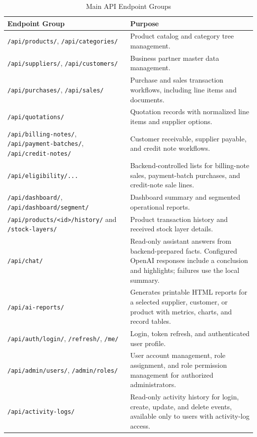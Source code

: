 \begin{table}[H]
	\centering
	\BlackbookTableSetup
	\renewcommand{\arraystretch}{1.45}
	\caption{Main API Endpoint Groups}
	\label{tab:api-endpoint-groups}
	\begin{tabularx}{\textwidth}{|B{4cm}|Z|}
		\hline
		\textbf{Endpoint Group} & \textbf{Purpose} \\ \hline
		\texttt{/api/products/}, \texttt{/api/categories/} & Product catalog and category tree management. \\ \hline
		\texttt{/api/suppliers/}, \texttt{/api/customers/} & Business partner master data management. \\ \hline
		\texttt{/api/purchases/}, \texttt{/api/sales/} & Purchase and sales transaction workflows, including line items and documents. \\ \hline
		\texttt{/api/quotations/} & Quotation records with normalized line items and supplier options. \\ \hline
		\texttt{/api/billing-notes/}, \texttt{/api/payment-batches/}, \texttt{/api/credit-notes/} & Customer receivable, supplier payable, and credit note workflows. \\ \hline
		\texttt{/api/eligibility/...} & Backend-controlled lists for billing-note sales, payment-batch purchases, and credit-note sale lines. \\ \hline
		\texttt{/api/dashboard/}, \texttt{/api/dashboard/segment/} & Dashboard summary and segmented operational reports. \\ \hline
		\texttt{/api/products/<id>/history/} and \texttt{/stock-layers/} & Product transaction history and received stock layer details. \\ \hline
		\texttt{/api/chat/} & Read-only assistant answers from backend-prepared facts. Configured OpenAI responses include a conclusion and highlights; failures use the local summary. \\ \hline
		\texttt{/api/ai-reports/} & Generates printable HTML reports for a selected supplier, customer, or product with metrics, charts, and record tables. \\ \hline
		\texttt{/api/auth/login/}, \texttt{/refresh/}, \texttt{/me/} & Login, token refresh, and authenticated user profile. \\ \hline
		\texttt{/api/admin/users/}, \texttt{/admin/roles/} & User account management, role assignment, and role permission management for authorized administrators. \\ \hline
		\texttt{/api/activity-logs/} & Read-only activity history for login, create, update, and delete events, available only to users with activity-log access. \\ \hline
	\end{tabularx}
\end{table}

